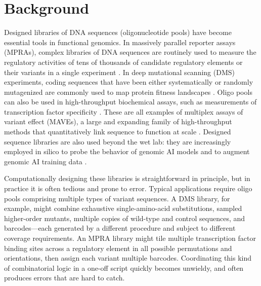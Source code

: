 \documentclass[pdflatex,sn-vancouver-num,referee,oneside]{sn-jnl}
\begin{document}
\modulolinenumbers[1]
\linenumbers
\maketitle

\section{Background}\label{sec:background}

Designed libraries of DNA sequences (oligonucleotide pools) have become essential tools in functional genomics. In massively parallel reporter assays (MPRAs), complex libraries of DNA sequences are routinely used to measure the regulatory activities of tens of thousands of candidate regulatory elements or their variants in a single experiment \citep{Patwardhan2009cw, Kinney2010tn, Melnikov2012dw, Kwasnieski2012hu, Sharon2012io, Mogno2013cf, Levo2014hl, Inoue2015cs, Vvedenskaya2015ih, Urtecho2018hu, Klein2020, Romero2023, LaFleur2024aa}. In deep mutational scanning (DMS) experiments, coding sequences that have been either systematically or randomly mutagenized are commonly used to map protein fitness landscapes \citep{Fowler2010gt, Hietpas2011bp, Fowler2014gq, Olson2014iq, Adams2016dka, Findlay2018kd, Starr2020aa}. Oligo pools can also be used in high-throughput biochemical assays, such as measurements of transcription factor specificity \citep{Berger2006wp, Maerkl2007tv, Noyes2008vr, Gordan2013, Le2018cr, Shen2018ip, Khetan2025_paditseq}. These are all examples of multiplex assays of variant effect (MAVEs), a large and expanding family of high-throughput methods that quantitatively link sequence to function at scale \citep{Kinney2019jc, Starita2017ec, Weile2018gm}. Designed sequence libraries are also used beyond the wet lab: they are increasingly employed in silico to probe the behavior of genomic AI models \citep{Avsec2021bpnet, Toneyan2024creme, Seitz2024squid, Seitz2025, Nagai2026review} and to augment genomic AI training data \citep{Lee2023}.

Computationally designing these libraries is straightforward in principle, but in practice it is often tedious and prone to error. Typical applications require oligo pools comprising multiple types of variant sequences. A DMS library, for example, might combine exhaustive single-amino-acid substitutions, sampled higher-order mutants, multiple copies of wild-type and control sequences, and barcodes---each generated by a different procedure and subject to different coverage requirements. An MPRA library might tile multiple transcription factor binding sites across a regulatory element in all possible permutations and orientations, then assign each variant multiple barcodes. Coordinating this kind of combinatorial logic in a one-off script quickly becomes unwieldy, and often produces errors that are hard to catch.
\end{document}
